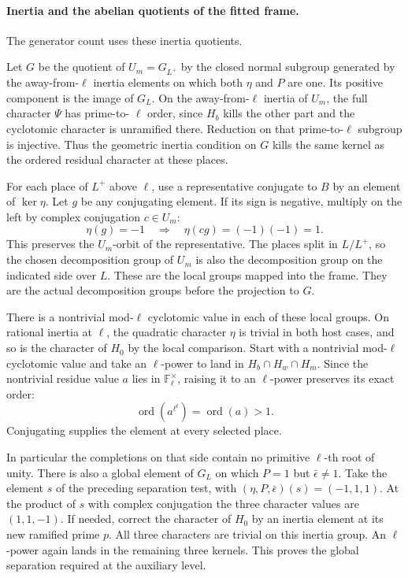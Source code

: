 \paragraph{Inertia and the abelian quotients of the fitted frame.}
The generator count uses these inertia quotients.

Let \(G\) be the quotient of \(U_m=G_{L^+}\) by the closed
normal subgroup generated by the away-from-\(\ell\) inertia
elements on which both \(\eta\) and \(P\) are one. Its positive
component is the image of \(G_L\). On the away-from-\(\ell\)
inertia of \(U_m\), the full character \(\Psi\) has prime-to-
\(\ell\) order, since \(H_b\) kills the other part and the
cyclotomic character is unramified there. Reduction on that
prime-to-\(\ell\) subgroup is injective. Thus the geometric
inertia condition on \(G\) kills the same kernel as the
ordered residual character at these places.

For each place of \(L^+\) above \(\ell\), use a representative
conjugate to \(B\) by an element of \(\ker\eta\). Let \(g\) be any conjugating element. If its sign is negative, multiply on the left by complex conjugation \(c\in U_m\):
\[
 \eta(g)=-1\quad\Longrightarrow\quad \eta(cg)=(-1)(-1)=1 .
\]
This preserves the \(U_m\)-orbit of the representative. The
places split in \(L/L^+\), so the chosen decomposition group
of \(U_m\) is also the decomposition group on the indicated
side over \(L\). These are the local groups mapped into the
frame. They are the actual decomposition groups before the
projection to \(G\).

There is a nontrivial mod-\(\ell\) cyclotomic value in each
of these local groups. On rational inertia at \(\ell\), the
quadratic character \(\eta\) is trivial in both host cases,
and so is the character of \(H_0\) by the local comparison.
Start with a nontrivial mod-\(\ell\) cyclotomic value and take
an \(\ell\)-power to land in \(H_b\cap H_w\cap H_m\).
Since the nontrivial residue value \(a\) lies in \(\mathbb F_\ell^\times\), raising it to an \(\ell\)-power preserves its exact order:
\[
 \operatorname{ord}(a^{\ell^t})=\operatorname{ord}(a)>1 .
\] Conjugating supplies
the element at every selected place.

In particular the
completions on that side contain no primitive \(\ell\)-th
root of unity. There is also a global element of \(G_L\)
on which \(P=1\) but \(\bar\epsilon\ne1\). Take the element
\(s\) of the preceding separation test, with
\((\eta,P,\bar\epsilon)(s)=(-1,1,1)\). At the product of \(s\) with complex conjugation the three character values are \((1,1,-1)\).
If needed, correct the character of \(H_0\) by an inertia
element at its new ramified prime \(p\). All three characters are trivial on this inertia group. An \(\ell\)-power again
lands in the remaining three kernels. This proves the
global separation required at the auxiliary level.

